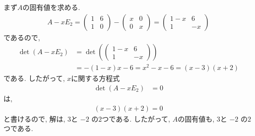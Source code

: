 まず$A$の固有値を求める.
\begin{align*}
  A-xE_2=\begin{pmatrix}1&6\\1&0\end{pmatrix}-\begin{pmatrix}x&0\\0&x\end{pmatrix}
=\begin{pmatrix}1-x&6\\1&-x\end{pmatrix}
\end{align*}
であるので,
\begin{align*}
  \det(A-xE_2)&=\det(\begin{pmatrix}1-x&6\\1&-x\end{pmatrix})\\
    &=-(1-x)x-6
    =x^2-x-6
    =(x-3)(x+2)
\end{align*}
である.
したがって, $x$に関する方程式
\begin{align*}
  \det(A-xE_2)&=0
\end{align*}
は,
\begin{align*}
  (x-3)(x+2)=0
\end{align*}
と書けるので,
解は,
$3$と
$-2$
の$2$つである.
したがって,
$A$の固有値も,
$3$と
$-2$
の$2$つである.


